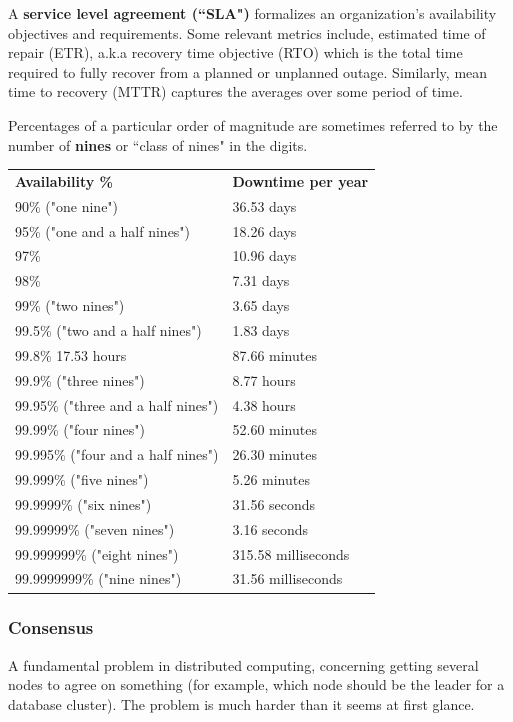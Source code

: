 \documentclass{article}
\begin{document}
    A \textbf{service level agreement (``SLA")} formalizes an organization's availability objectives and requirements. Some relevant metrics include, estimated time of repair (ETR), a.k.a recovery time objective (RTO) which is the total time required to fully recover from a planned or unplanned outage. Similarly, mean time to recovery (MTTR) captures the averages over some period of time.
    
    Percentages of a particular order of magnitude are sometimes referred to by the number of \textbf{nines} or ``class of nines" in the digits.

    \begin{table}[]
        \centering
        \begin{tabular}{l|l}
            \textbf{Availability \%	}& \textbf{Downtime per year} \\ 
            90\% ("one nine") & 36.53 days \\
            95\% ("one and a half nines") &	18.26 days \\
            97\% & 10.96 days	\\
            98\% & 7.31 days	\\
            99\% ("two nines")& 3.65 days	\\
            99.5\% ("two and a half nines") & 1.83 days \\
            99.8\%	17.53 hours	& 87.66 minutes	\\
            99.9\% ("three nines")	& 8.77 hours \\
            99.95\% ("three and a half nines")	& 4.38 hours	\\
            99.99\% ("four nines") & 52.60 minutes	\\
            99.995\% ("four and a half nines") & 26.30 minutes \\
            99.999\% ("five nines") & 5.26 minutes \\
            99.9999\% ("six nines")	& 31.56 seconds \\
            99.99999\% ("seven nines")	& 3.16 seconds	\\
            99.999999\% ("eight nines") & 315.58 milliseconds \\
            99.9999999\% ("nine nines") & 31.56 milliseconds \\
        \end{tabular}
    \end{table}
    
    \subsubsection{Consensus}
    A fundamental problem in distributed computing, concerning getting several nodes to agree on something (for example, which node should be the leader for a database cluster). The problem is much harder than it seems at first glance.
    
\end{document}
